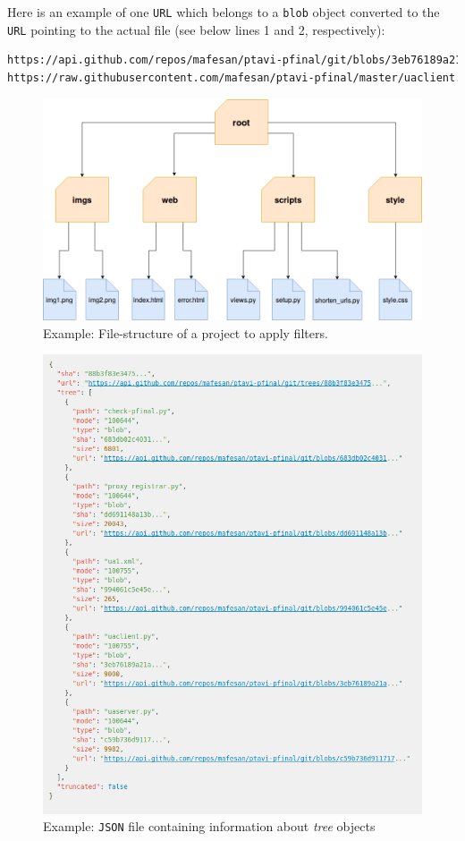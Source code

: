 \documentclass[a4paper, 12pt]{book}
\begin{document}
Here is an example of one \texttt{URL} which belongs to a \texttt{blob} object converted to the \texttt{URL}
pointing to the actual file (see below lines 1 and 2, respectively):
\begin{lstlisting}[language=bash]
https://api.github.com/repos/mafesan/ptavi-pfinal/git/blobs/3eb76189a21a...
https://raw.githubusercontent.com/mafesan/ptavi-pfinal/master/uaclient.py \end{lstlisting}
\begin{figure}
  \centering
  \includegraphics[width=13cm, keepaspectratio]{img/file-structure-example}
  \caption{Example: File-structure of a project to apply filters.}
  \label{fig:file-structure-example}
\end{figure}
\begin{figure}
  \centering
  \includegraphics[width=15cm, keepaspectratio]{img/gh-api-trees-json-example}
  \caption{Example: \texttt{JSON} file containing information about \textit{tree} objects}
  \label{fig:gh-tree-json}
\end{figure}
\end{document}
